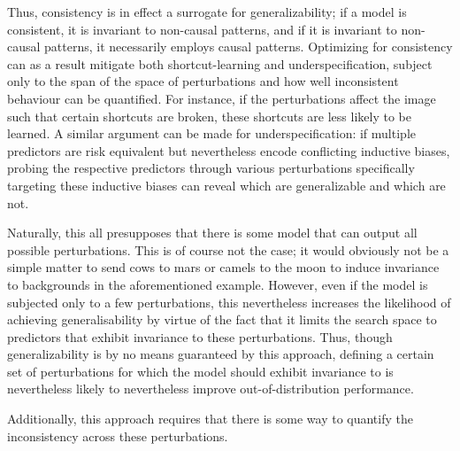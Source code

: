 Thus, consistency is in effect a surrogate for generalizability; if a model is consistent, it is invariant to non-causal patterns, and if it is invariant to non-causal patterns, it necessarily employs causal patterns. Optimizing for consistency can as a result mitigate both shortcut-learning and underspecification, subject only to the span of the space of perturbations and how well inconsistent behaviour can be quantified. For instance, if the perturbations affect the image such that certain shortcuts are broken, these shortcuts are less likely to be learned. A similar argument can be made for underspecification: if multiple predictors are risk equivalent but nevertheless encode conflicting inductive biases, probing the respective predictors through various perturbations specifically targeting these inductive biases can reveal which are generalizable and which are not.

Naturally, this all presupposes that there is some model that can output all possible perturbations. This is of course not the case; it would obviously not be a simple matter to send cows to mars or camels to the moon to induce invariance to backgrounds in the aforementioned example. However, even if the model is subjected only to a few perturbations, this nevertheless increases the likelihood of achieving generalisability by virtue of the fact that it limits the search space to predictors that exhibit invariance to these perturbations. Thus, though generalizability is by no means guaranteed by this approach, defining a certain set of perturbations for which the model should exhibit invariance to is nevertheless likely to nevertheless improve out-of-distribution performance. 

Additionally, this approach requires that there is some way to quantify the inconsistency across these perturbations. 


